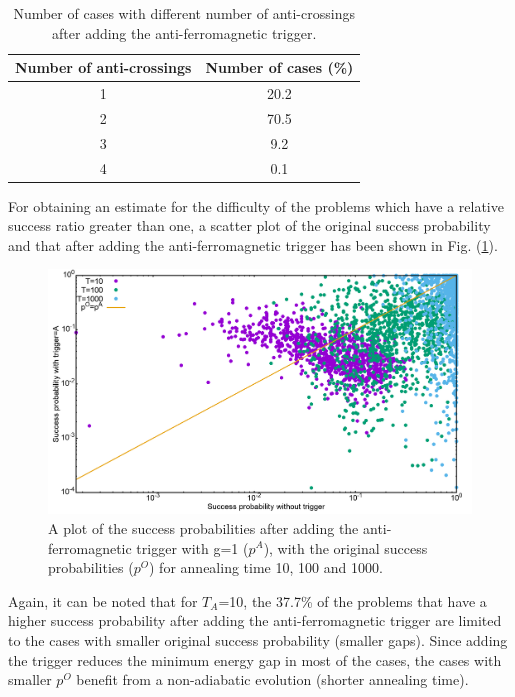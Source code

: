 \documentclass[../main.tex]{subfiles}
\begin{document}
\begin{table}[H]
\centering
\renewcommand{\arraystretch}{1.5}
\begin{tabular}{|c|c|}
\hline 
Number of anti-crossings & Number of cases (\%) \\ 
\hline 
1 & 20.2 \\ 
\hline 
2 & 70.5 \\ 
\hline 
3 & 9.2 \\ 
\hline 
4 & 0.1 \\ 
\hline 
\end{tabular} 
\caption{Number of cases with different number of anti-crossings after adding the anti-ferromagnetic trigger.}
\label{tab:a4}

\end{table}
For obtaining an estimate for the difficulty of the problems which have a relative success ratio greater than one, a scatter plot of the original success probability and that after adding the anti-ferromagnetic trigger has been shown in Fig. (\ref{fig:a22}).


\begin{figure}[H]
\centering 
\includegraphics[scale=0.24]{ProbScat_g1.png}
\caption{A plot of the success probabilities after adding the anti-ferromagnetic trigger with g=1 ($p^A$), with the original success probabilities ($p^O$) for annealing time 10, 100 and 1000.}
\label{fig:a22}
\end{figure}

Again, it can be noted that for $T_A$=10, the 37.7\% of the problems that have a higher success probability after adding the anti-ferromagnetic trigger are limited to the cases with smaller original success probability (smaller gaps). Since adding the trigger reduces the minimum energy gap in most of the cases, the cases with smaller $p^O$ benefit from a non-adiabatic evolution (shorter annealing time).\\
\end{document}
